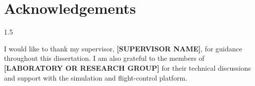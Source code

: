 \chapter*{\centering Acknowledgements}

\begin{spacing}{1.5}
\setlength{\parskip}{0.3in}

I would like to thank my supervisor, \textbf{[SUPERVISOR NAME]}, for guidance throughout this dissertation. I am also grateful to the members of \textbf{[LABORATORY OR RESEARCH GROUP]} for their technical discussions and support with the simulation and flight-control platform.


\end{spacing}
\newpage

